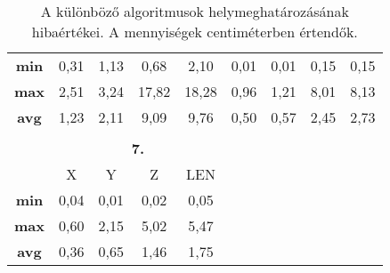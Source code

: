 \documentclass{article}
\begin{document}
\begin{table}[H]
\begin{tabular}{ccccccccc}
\multicolumn{1}{c|}{\textbf{min}} & 0,31 & 1,13 & 0,68  & \multicolumn{1}{c|}{2,10}   & 0,01      & 0,01      & 0,15      & 0,15      \\
\multicolumn{1}{c|}{\textbf{max}} & 2,51 & 3,24 & 17,82 & \multicolumn{1}{c|}{18,28}  & 0,96      & 1,21      & 8,01      & 8,13      \\
\multicolumn{1}{c|}{\textbf{avg}} & 1,23 & 2,11 & 9,09  & \multicolumn{1}{c|}{9,76}   & 0,50      & 0,57      & 2,45      & 2,73      \\
\textbf{}                         &      &      &       &                             &           &           &           &           \\
\multicolumn{1}{c|}{}             & \multicolumn{4}{c}{\textbf{7.}}                   & \textbf{} & \textbf{} & \textbf{} & \textbf{} \\
\multicolumn{1}{c|}{\textbf{}}    & X    & Y    & Z     & LEN                         &           &           &           &           \\ \cline{1-5}
\multicolumn{1}{c|}{\textbf{min}} & 0,04 & 0,01 & 0,02  & 0,05                        &           &           &           &           \\
\multicolumn{1}{c|}{\textbf{max}} & 0,60 & 2,15 & 5,02  & 5,47                        &           &           &           &           \\
\multicolumn{1}{c|}{\textbf{avg}} & 0,36 & 0,65 & 1,46  & 1,75                        &           &           &           &          
\end{tabular}

\caption{A különböző algoritmusok helymeghatározásának hibaértékei. A mennyiségek centiméterben értendők.}
\end{table}
\end{document}
